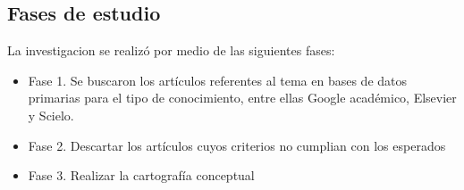 \subsection{Fases de estudio}

La investigacion se realiz\'o por medio de las siguientes fases:

\begin{itemize}
   \item Fase 1. Se buscaron los art\'iculos referentes al tema en bases de datos primarias para el tipo de conocimiento, entre ellas Google acad\'emico, Elsevier y Scielo.
   \item Fase 2. Descartar los art\'iculos cuyos criterios no cumplian con los esperados
      
   \item Fase 3. Realizar la cartografía conceptual
\end{itemize}

%

